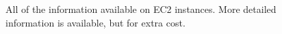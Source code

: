 \begin{figure}[!htbp]
    \centering
    \caption[AWS EC2 Basic Monitoring]{All of the information available on EC2 instances. More detailed information is available, but for extra cost.}
    \label{fig:aws-ec2-basic-observability}
\end{figure} 
    